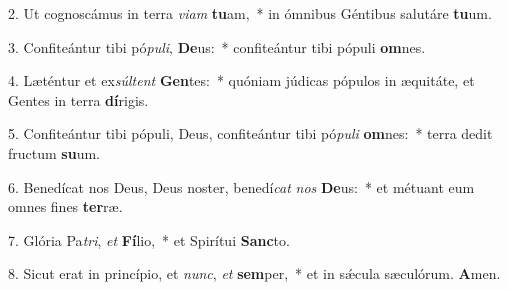 2. Ut cognoscámus in terra \textit{vi}\textit{am} \textbf{tu}am,~*  in ómnibus Géntibus salutáre \textbf{tu}um.\

3. Confiteántur tibi pó\textit{pu}\textit{li}, \textbf{De}us:~*  confiteántur tibi pópuli \textbf{om}nes.\

4. Læténtur et ex\textit{súl}\textit{tent} \textbf{Gen}tes:~*  quóniam júdicas pópulos in æquitáte, et Gentes in terra \textbf{dí}rigis.\

5. Confiteántur tibi pópuli, Deus, confiteántur tibi pó\textit{pu}\textit{li} \textbf{om}nes:~*  terra dedit fructum \textbf{su}um.\

6. Benedícat nos Deus, Deus noster, benedí\textit{cat} \textit{nos} \textbf{De}us:~*  et métuant eum omnes fines \textbf{ter}ræ.\

7. Glória Pa\textit{tri}, \textit{et} \textbf{Fí}lio,~*  et Spirítui \textbf{Sanc}to.\

8. Sicut erat in princípio, et \textit{nunc}, \textit{et} \textbf{sem}per,~*  et in sǽcula sæculórum. \textbf{A}men.\

